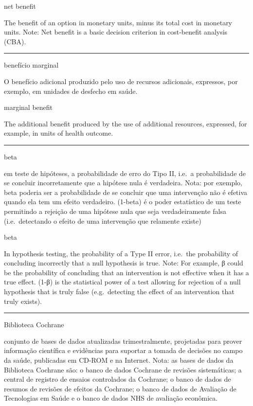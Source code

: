 \documentclass[
  openany]{book}
\begin{document}
net benefit

The benefit of an option in monetary units, minus its total cost in monetary units. Note: Net benefit is a basic decision criterion in cost-benefit analysis (CBA).

\begin{center}\rule{0.5\linewidth}{0.5pt}\end{center}

benefício marginal

O benefício adicional produzido pelo uso de recursos adicionais, expressos, por exemplo, em unidades de desfecho em saúde.

marginal benefit

The additional benefit produced by the use of additional resources, expressed, for example, in units of health outcome.

\begin{center}\rule{0.5\linewidth}{0.5pt}\end{center}

beta

em teste de hipóteses, a probabilidade de erro do Tipo II, i.e.~a probabilidade de se concluir incorretamente que a hipótese nula é verdadeira. Nota: por exemplo, beta poderia ser a probabilidade de se concluir que uma intervenção não é efetiva quando ela tem um efeito verdadeiro. (1-beta) é o poder estatístico de um teste permitindo a rejeição de uma hipótese nula que seja verdadeiramente falsa (i.e.~detectando o efeito de uma intervenção que relamente existe)

beta

In hypothesis testing, the probability of a Type II error, i.e.~the probability of concluding incorrectly that a null hypothesis is true. Note: For example, β could be the probability of concluding that an intervention is not effective when it has a true effect. (1-β) is the statistical power of a test allowing for rejection of a null hypothesis that is truly false (e.g.~detecting the effect of an intervention that truly exists).

\begin{center}\rule{0.5\linewidth}{0.5pt}\end{center}

Biblioteca Cochrane

conjunto de bases de dados atualizadas trimestralmente, projetadas para prover informação científica e evidências para suportar a tomada de decisões no campo da saúde, publicadas em CD-ROM e na Internet. Nota: as bases de dados da Biblioteca Cochrane são: o banco de dados Cochrane de revisões sistemáticas; a central de registro de ensaios controlados da Cochrane; o banco de dados de resumos de revisões de efeitos da Cochrane; o banco de dados de Avaliação de Tecnologias em Saúde e o banco de dados NHS de avaliação econômica.
\end{document}
